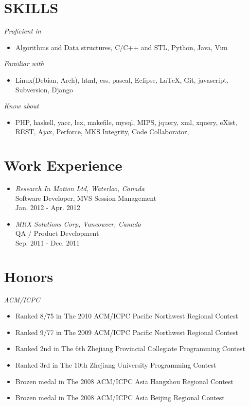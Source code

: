 \documentclass[line,margin]{res}
\begin{document}
\address{7541 Colleen Street Burnaby, BC, Canada, V5A 2A5}
\address{+1-778-862-3661 \\ zmin@sfu.ca}
\begin{resume}
\section{SKILLS} 
	{\sl Proficient in } 
						\begin{itemize}
						\item Algorithms and Data structures, C/C++ and STL, Python, Java, Vim
						\end{itemize}
    {\sl Familiar with }
						\begin{itemize}
						\item Linux(Debian, Arch), html, css, pascal, Eclipse, \LaTeX, Git, javascript, Subversion, Django
						\end{itemize}
 	{\sl Know about } 
					\begin{itemize}
					\item PHP, haskell, yacc, lex, makefile, mysql, MIPS, jquery, xml, xquery, eXist, REST, Ajax, Perforce, MKS Integrity, Code Collaborator, 
					\end{itemize}

\section{Work Experience}
\begin{itemize}
\item {\sl Research In Motion Ltd, Waterloo, Canada}\\
 Software Developer, MVS Session Management \\
Jan. 2012 - Apr. 2012
\item {\sl MRX Solutions Corp, Vancouver, Canada}\\
 QA / Product Development \\
Sep. 2011 - Dec. 2011
\end{itemize}


\section{Honors}
{\sl ACM/ICPC}
\begin{itemize}
\item Ranked 8/75 in The 2010 ACM/ICPC Pacific Northwest Regional Contest	
\item Ranked 9/77 in The 2009 ACM/ICPC Pacific Northwest Regional Contest	
\item Ranked 2nd in The 6th Zhejiang Provincial Collegiate Programming Contest 
\item Ranked 3rd in The 10th Zhejiang University Programming Contest 
\item Brozen medal in The 2008 ACM/ICPC Asia Hangzhou Regional Contest 
\item Brozen medal in The 2008 ACM/ICPC Asia Beijing Regional Contest   


\end{itemize}
\end{resume}
\end{document}
